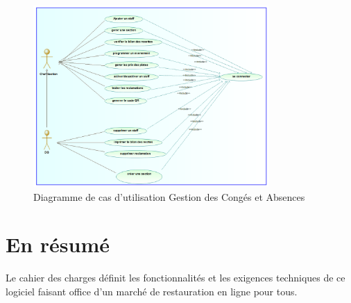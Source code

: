 \begin{figure}[H]
    \centering
    \includegraphics[width=0.8\textwidth]{images/diagrammes/use-cases/DG.png}
    \caption{Diagramme de cas d'utilisation Gestion des Congés et Absences}
    \label{fig:use_case_gestion_conges}

\end{figure}



\section{En résumé}
Le cahier des charges définit les fonctionnalités et les exigences techniques de ce logiciel faisant office d'un marché de restauration en ligne pour tous.
\clearpage
